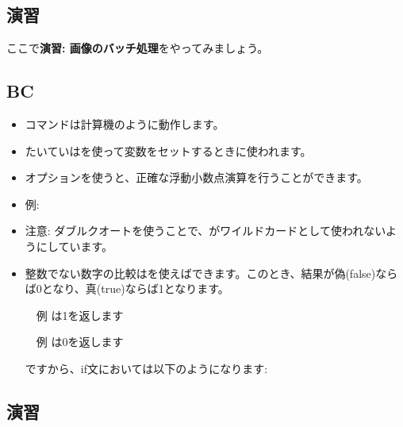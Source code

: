 \documentclass{jsarticle}
\begin{document}
\subsection*{演習}

ここで{\bf 演習: 画像のバッチ処理}をやってみましょう。



\subsection{BC}


\begin{itemize}
\item {\color{red}}コマンドは計算機のように動作します。
\item たいていは{\color{red}{\em echo, パイプ, バッククオート}}を使って変数をセットするときに使われます。
\item {\color{red}}オプションを使うと、正確な浮動小数点演算を行うことができます。
\item 例:

{\color{red}{\tt
\$ a=2;

\$ a=`echo "3 * \$a + 1" | bc -l`;

\$ echo \$a

　7 
}}

\bigskip

\item 注意: ダブルクオートを使うことで、{\color{red}\Q{*}}がワイルドカードとして使われないようにしています。
 
\end{itemize}




\begin{itemize}
\item 整数でない数字の比較は{\color{red}}を使えばできます。このとき、結果が偽(false)ならば0となり、真(true)ならば1となります。

　例 {\color{red}}は1を返します

　例 {\color{red}}は0を返します

ですから、if文においては以下のようになります:

{\color{red}}

\end{itemize}




\subsection*{演習}
\end{document}
